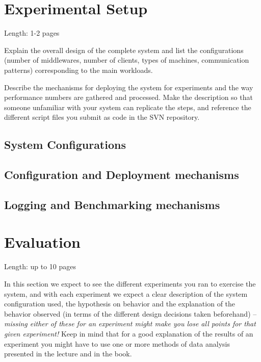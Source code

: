 \documentclass[11pt]{article}
\begin{document}
\section{Experimental Setup}\label{sec:experimental-setup}

Length: 1-2 pages

Explain the overall design of the complete system and list the
configurations (number of middlewares, number of clients, types of
machines, communication patterns) corresponding to the main workloads.

Describe the mechanisms for deploying the system for experiments and the
way performance numbers are gathered and processed. Make the description
so that someone unfamiliar with your system can replicate the steps, and
reference the different script files you submit as code in the SVN
repository.

\subsection{System Configurations}\label{sec:system-configurations}

\subsection{Configuration and Deployment mechanisms}\label{sec:configuration-and-deployment-mechanisms}

\subsection{Logging and Benchmarking mechanisms}\label{sec:logging-and-benchmarking-mechanisms}

\section{Evaluation}\label{sec:evaluation}

Length: up to 10 pages

In this section we expect to see the different experiments you ran to
exercise the system, and with each experiment we expect a clear
description of the system configuration used, the hypothesis on behavior
and the explanation of the behavior observed (in terms of the different
design decisions taken beforehand) -- \emph{missing either of these for
an experiment might make you lose all points for that given experiment!}
Keep in mind that for a good explanation of the results of an experiment
you might have to use one or more methods of data analysis presented in
the lecture and in the book.
\end{document}
